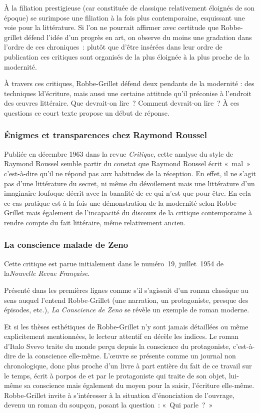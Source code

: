 \documentclass[12pt, a4paper]{article}
\begin{document}
À la filiation prestigieuse (car constituée de classique relativement éloignés de son époque) se surimpose une filiation à la fois plus contemporaine, esquissant une voie pour la littérature. Si l'on ne pourrait affirmer avec certitude que Robbe-grillet défend l'idée d'un progrès en art, on observe du moins une gradation dans l'ordre de ces chroniques~: plutôt que d'être insérées dans leur ordre de publication ces critiques sont organisés de la plus éloignée à la plus proche de la modernité.

À travers ces critiques, Robbe-Grillet défend deux pendants de la modernité : des techniques ld'écriture, mais aussi une certaine attitude qu'il préconise à l'endroit des œuvres littéraire. Que devrait-on lire~? Comment devrait-on lire~? À ces questions ce court texte propose un début de réponse.


\subsubsection{Énigmes et transparences chez Raymond Roussel}
Publiée en décembre 1963 dans la revue \textit{Critique}, cette analyse du style de Raymond Roussel semble partir du constat que Raymond Roussel écrit «~mal~» c'est-à-dire qu'il ne répond pas aux habitudes de la réception. En effet, il ne s'agit pas d'une littérature du secret, ni même du dévoilement mais une littérature d'un imaginaire loufoque décrit avec la banalité de ce qui n'est que pour être. En cela ce cas pratique est à la fois une démonstration de la modernité selon Robbe-Grillet mais également de l'incapacité du discours de la critique contemporaine à rendre compte du fait littéraire, même relativement ancien.

\subsubsection{La conscience malade de Zeno}
Cette critique est parue initialement dans le numéro~19, juillet~1954 de la\textit{Nouvelle Revue Française}.

Présenté dans les premières lignes comme s'il s'agissait d'un roman classique au sens auquel l'entend Robbe-Grillet (une narration, un protagoniste, presque des épisodes, etc.), \textit{La Conscience de Zeno} se révèle un exemple de roman moderne.

Et si les thèses esthétiques de Robbe-Grillet n'y sont jamais détaillées ou même explicitement mentionnées, le lecteur attentif en décèle les indices. Le roman d'Italo Svevo traite du monde perçu depuis la conscience du protagoniste, c'est-à-dire de la conscience elle-même. L'œuvre se présente comme un journal non chronologique, donc plus proche d'un livre à part entière du fait de ce travail sur le temps, écrit à porpos de et par le protagoniste qui traite de son objet, lui-même sa conscience mais également du moyen pour la saisir, l'écriture elle-même. Robbe-Grillet invite à s'intéresser à la situation d'énonciation de l'ouvrage, devenu un roman du soupçon, posant la question~: «~Qui parle~?~»
\end{document}
